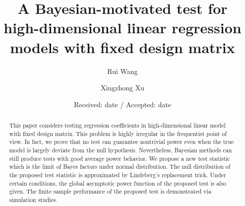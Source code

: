 \documentclass[smallextended]{svjour3}       %
\begin{document}
\title{
A Bayesian-motivated test for high-dimensional linear regression models with fixed design matrix
}


\author{ Rui Wang         \and
        Xingzhong Xu %
}



\date{Received: date / Accepted: date}


\maketitle

\begin{abstract}

This paper considers testing regression coefficients in high-dimensional linear model with fixed design matrix.
This problem is highly irregular in the frequentist point of view.
In fact, we prove that no test can guarantee nontrivial power even when the true model is largely deviate from the null hypothesis.
    Nevertheless, Bayesian methods can still produce tests with good average power behavior.
    We propose a new test statistic which is the limit of Bayes factors under normal distribution.
    The null distribution of the proposed test statistic is approximated by Lindeberg's replacement trick.
    Under certain conditions, the global asymptotic power function of the proposed test is also given.
    The finite sample performance of the proposed test is demonstrated via simulation studies.
\end{abstract}
\end{document}
